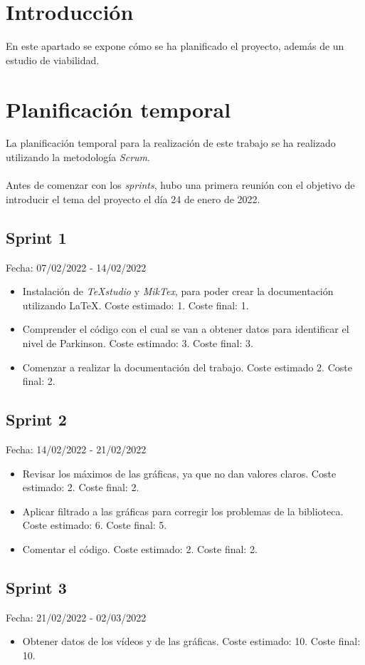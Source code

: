 
\section{Introducción}
En este apartado se expone cómo se ha planificado el proyecto, además de un estudio de viabilidad.
\section{Planificación temporal}
La planificación temporal para la realización de este trabajo se ha realizado utilizando la metodología \textit{Scrum}.\\
\\
Antes de comenzar con los \textit{sprints}, hubo una primera reunión con el objetivo de introducir el tema del proyecto el día 24 de enero de 2022.

\subsection{Sprint 1}
Fecha: 07/02/2022 - 14/02/2022
\begin{itemize}
	\item Instalación de \textit{TeXstudio} y \textit{MikTex}, para poder crear la documentación utilizando \LaTeX{}. Coste estimado: 1. Coste final: 1.
	\item Comprender el código con el cual se van a obtener datos para identificar el nivel de Parkinson. Coste estimado: 3. Coste final: 3.
	\item Comenzar a realizar la documentación del trabajo. Coste estimado 2. Coste final: 2.
\end{itemize}

\subsection{Sprint 2}
Fecha: 14/02/2022 - 21/02/2022
\begin{itemize}
	\item Revisar los máximos de las gráficas, ya que no dan valores claros. Coste estimado: 2. Coste final: 2. 
	\item Aplicar filtrado a las gráficas para corregir los problemas de la biblioteca. Coste estimado: 6. Coste final: 5.
	\item Comentar el código. Coste estimado: 2. Coste final: 2.
\end{itemize}

\subsection{Sprint 3}
Fecha: 21/02/2022 - 02/03/2022
\begin{itemize}
	\item Obtener datos de los vídeos y de las gráficas. Coste estimado: 10. Coste final: 10. 
\end{itemize}


